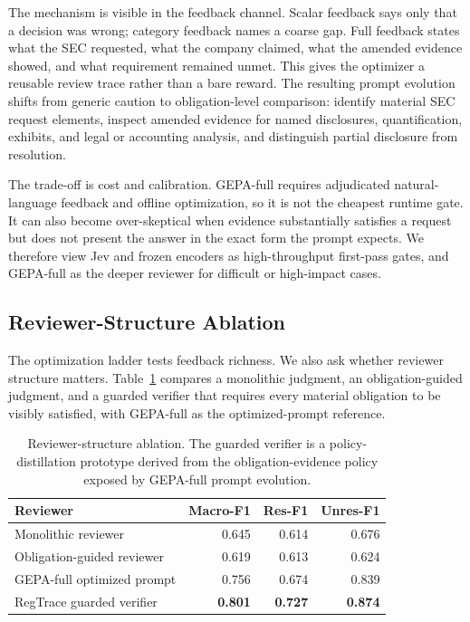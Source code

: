 \documentclass[11pt]{article}
\begin{document}
The mechanism is visible in the feedback channel. Scalar feedback says only that a decision was wrong; category feedback names a coarse gap. Full feedback states what the SEC requested, what the company claimed, what the amended evidence showed, and what requirement remained unmet. This gives the optimizer a reusable review trace rather than a bare reward. The resulting prompt evolution shifts from generic caution to obligation-level comparison: identify material SEC request elements, inspect amended evidence for named disclosures, quantification, exhibits, and legal or accounting analysis, and distinguish partial disclosure from resolution.

The trade-off is cost and calibration. GEPA-full requires adjudicated natural-language feedback and offline optimization, so it is not the cheapest runtime gate. It can also become over-skeptical when evidence substantially satisfies a request but does not present the answer in the exact form the prompt expects. We therefore view Jev and frozen encoders as high-throughput first-pass gates, and GEPA-full as the deeper reviewer for difficult or high-impact cases.

\subsection{Reviewer-Structure Ablation}

The optimization ladder tests feedback richness. We also ask whether reviewer structure matters. Table~\ref{tab:guarded} compares a monolithic judgment, an obligation-guided judgment, and a guarded verifier that requires every material obligation to be visibly satisfied, with GEPA-full as the optimized-prompt reference.

\begin{table}[t]
\centering
\scriptsize
\setlength{\tabcolsep}{4pt}
\begin{tabular}{lrrr}
\toprule
\textbf{Reviewer} & \textbf{Macro-F1} & \textbf{Res-F1} & \textbf{Unres-F1} \\
\midrule
Monolithic reviewer & 0.645 & 0.614 & 0.676 \\
Obligation-guided reviewer & 0.619 & 0.613 & 0.624 \\
GEPA-full optimized prompt & 0.756 & 0.674 & 0.839 \\
RegTrace guarded verifier & \textbf{0.801} & \textbf{0.727} & \textbf{0.874} \\
\bottomrule
\end{tabular}
\caption{Reviewer-structure ablation. The guarded verifier is a policy-distillation prototype derived from the obligation-evidence policy exposed by GEPA-full prompt evolution.}
\label{tab:guarded}
\end{table}
\end{document}
